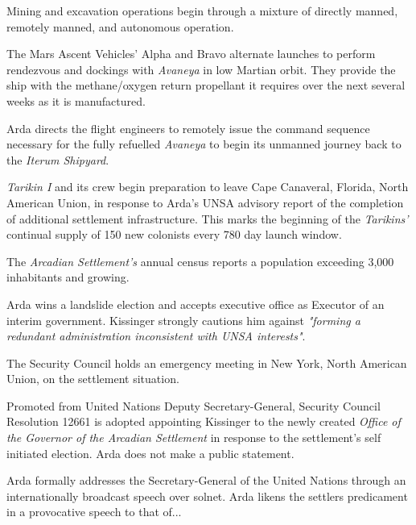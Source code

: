 Mining and excavation operations begin through a mixture of directly manned, remotely manned, and autonomous operation.
\StopTimelineDate

The Mars Ascent Vehicles' Alpha and Bravo alternate launches to perform rendezvous and dockings with {\it Avaneya} in low Martian orbit. They provide the ship with the methane/oxygen return propellant it requires over the next several weeks as it is manufactured.
\StopTimelineDate

Arda directs the flight engineers to remotely issue the command sequence necessary for the fully refuelled {\it Avaneya} to begin its unmanned journey back to the {\it Iterum Shipyard}.
\StopTimelineDate

{\it Tarikin I} and its crew begin preparation to leave Cape Canaveral, Florida, North American Union, in response to Arda's UNSA advisory report of the completion of additional settlement infrastructure. This marks the beginning of the {\it Tarikins'} continual supply of 150 new colonists every 780 day launch window.
\StopTimelineDate

The {\it Arcadian Settlement's} annual census reports a population exceeding 3,000 inhabitants and growing.
\StopTimelineDate

Arda wins a landslide election and accepts executive office as Executor of an interim government. Kissinger strongly cautions him against {\it "forming a redundant administration inconsistent with UNSA interests"}. 

The Security Council holds an emergency meeting in New York, North American Union, on the settlement situation.
\StopTimelineDate

Promoted from United Nations Deputy Secretary-General, Security Council Resolution 12661 is adopted appointing Kissinger to the newly created {\it Office of the Governor of the Arcadian Settlement} in response to the settlement's self initiated election. Arda does not make a public statement.
\StopTimelineDate

Arda formally addresses the Secretary-General of the United Nations through an internationally broadcast speech over solnet. Arda likens the settlers predicament in a provocative speech to that of...
\crlf

